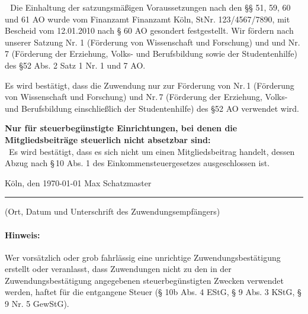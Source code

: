 \documentclass[11pt,ngerman]{scrartcl}
\newcommand{\mychecked}{\scalebox{1.5}{\XBox}~} %
\newcommand{\unmychecked}{\scalebox{1.5}{\Square}}
\begin{document}
\mychecked\,Die Einhaltung der satzungsmäßigen Voraussetzungen nach den §§ 51, 59, 60 und 61 AO wurde vom Finanzamt Finanzamt Köln, StNr. 123/4567/7890, mit Bescheid vom 12.01.2010 nach § 60 AO gesondert festgestellt. Wir fördern nach unserer Satzung Nr. 1 (Förderung von Wissenschaft und Forschung) und und Nr. 7 (Förderung der Erziehung, Volks- und Berufsbildung sowie der Studentenhilfe) des §52 Abs. 2 Satz 1 Nr. 1 und 7 AO.
 
\begin{mdframed}[style=MyFormStyle]%
\footnotesize Es wird bestätigt, dass die Zuwendung nur zur Förderung von Nr.\,1 (Förderung von Wissenschaft und Forschung) und  Nr.\,7 (Förderung der Erziehung, Volks- und Berufsbildung einschließlich der Studentenhilfe) des §52 AO verwendet wird. \vspace{0.5em}

\textbf{Nur für steuerbegünstigte Einrichtungen, bei denen die Mitgliedsbeiträge steuerlich nicht absetzbar sind:} \\
\unmychecked\, Es wird bestätigt, dass es sich nicht um einen Mitgliedsbeitrag handelt, dessen Abzug nach §\,10 Abs. 1 des Einkommensteuergesetzes ausgeschlossen ist. 

\end{mdframed} 


\vspace*{2.5em} 

Köln, den \today \hspace*{20em} Max Schatzmaster

\hrule

\vspace*{0.5em} (Ort, Datum und Unterschrift des Zuwendungsempfängers) 

\paragraph{Hinweis:} Wer vorsätzlich oder grob fahrlässig eine unrichtige Zuwendungsbestätigung erstellt oder veranlasst, dass 
Zuwendungen nicht zu den in der Zuwendungsbestätigung angegebenen steuerbegünstigten Zwecken verwendet 
werden, haftet für die entgangene Steuer (§ 10b Abs. 4 EStG, § 9 Abs. 3 KStG, § 9 Nr. 5 GewStG). 
\end{document}
